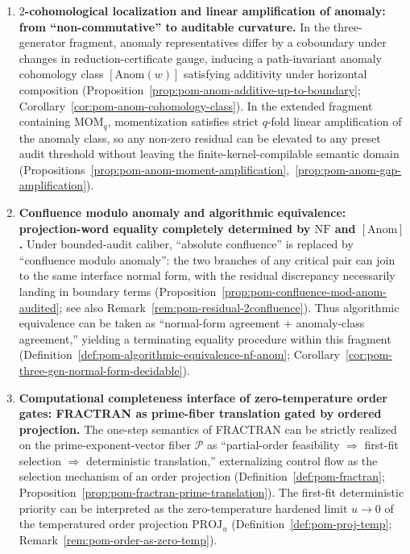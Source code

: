 \begin{enumerate}
  \item \textbf{\(2\)-cohomological localization and linear amplification of anomaly: from ``non-commutative'' to auditable curvature.}
  In the three-generator fragment, anomaly representatives differ by a coboundary under changes in reduction-certificate gauge, inducing a path-invariant anomaly cohomology class \([\mathrm{Anom}(w)]\) satisfying additivity under horizontal composition (Proposition~\ref{prop:pom-anom-additive-up-to-boundary}; Corollary~\ref{cor:pom-anom-cohomology-class}).
  In the extended fragment containing \(\mathrm{MOM}_q\), momentization satisfies strict \(q\)-fold linear amplification of the anomaly class, so any non-zero residual can be elevated to any preset audit threshold without leaving the finite-kernel-compilable semantic domain (Propositions~\ref{prop:pom-anom-moment-amplification},~\ref{prop:pom-anom-gap-amplification}).

  \item \textbf{Confluence modulo anomaly and algorithmic equivalence: projection-word equality completely determined by \texorpdfstring{$\mathrm{NF}$}{NF} and \texorpdfstring{$[\mathrm{Anom}]$}{[Anom]}.}
  Under bounded-audit caliber, ``absolute confluence'' is replaced by ``confluence modulo anomaly'': the two branches of any critical pair can join to the same interface normal form, with the residual discrepancy necessarily landing in boundary terms (Proposition~\ref{prop:pom-confluence-mod-anom-audited}; see also Remark~\ref{rem:pom-residual-2confluence}).
  Thus algorithmic equivalence can be taken as ``normal-form agreement + anomaly-class agreement,'' yielding a terminating equality procedure within this fragment (Definition~\ref{def:pom-algorithmic-equivalence-nf-anom}; Corollary~\ref{cor:pom-three-gen-normal-form-decidable}).

  \item \textbf{Computational completeness interface of zero-temperature order gates: FRACTRAN as prime-fiber translation gated by ordered projection.}
  The one-step semantics of FRACTRAN can be strictly realized on the prime-exponent-vector fiber \(\mathcal{P}\) as ``partial-order feasibility \(\Rightarrow\) first-fit selection \(\Rightarrow\) deterministic translation,'' externalizing control flow as the selection mechanism of an order projection (Definition~\ref{def:pom-fractran}; Proposition~\ref{prop:pom-fractran-prime-translation}).
  The first-fit deterministic priority can be interpreted as the zero-temperature hardened limit \(u\to 0\) of the temperatured order projection \(\mathrm{PROJ}_u\) (Definition~\ref{def:pom-proj-temp}; Remark~\ref{rem:pom-order-as-zero-temp}).


\end{enumerate}
